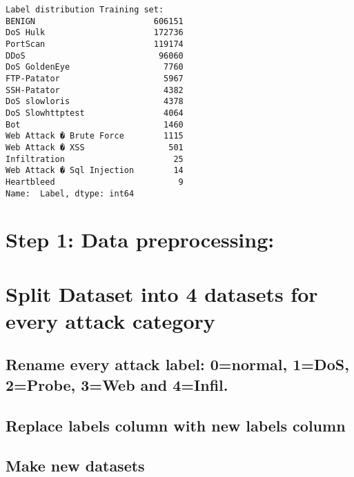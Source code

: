 \documentclass[11pt]{article}
\begin{document}
    \begin{Verbatim}[commandchars=\\\{\}]
Label distribution Training set:
BENIGN                        606151
DoS Hulk                      172736
PortScan                      119174
DDoS                           96060
DoS GoldenEye                   7760
FTP-Patator                     5967
SSH-Patator                     4382
DoS slowloris                   4378
DoS Slowhttptest                4064
Bot                             1460
Web Attack � Brute Force        1115
Web Attack � XSS                 501
Infiltration                      25
Web Attack � Sql Injection        14
Heartbleed                         9
Name:  Label, dtype: int64
    \end{Verbatim}

    \hypertarget{step-1-data-preprocessing}{%
\section{Step 1: Data preprocessing:}\label{step-1-data-preprocessing}}

    \hypertarget{split-dataset-into-4-datasets-for-every-attack-category}{%
\section{Split Dataset into 4 datasets for every attack
category}\label{split-dataset-into-4-datasets-for-every-attack-category}}

\hypertarget{rename-every-attack-label-0normal-1dos-2probe-3web-and-4infil.}{%
\subsection{Rename every attack label: 0=normal, 1=DoS, 2=Probe, 3=Web
and
4=Infil.}\label{rename-every-attack-label-0normal-1dos-2probe-3web-and-4infil.}}

\hypertarget{replace-labels-column-with-new-labels-column}{%
\subsection{Replace labels column with new labels
column}\label{replace-labels-column-with-new-labels-column}}

\hypertarget{make-new-datasets}{%
\subsection{Make new datasets}\label{make-new-datasets}}
\end{document}
